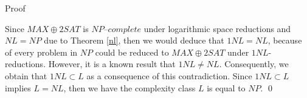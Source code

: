 \documentclass[11pt]{beamer}
\begin{document}
\begin{frame}{Proof}

Since $MAX\oplus2SAT$ is $\textit{NP--complete}$ under logarithmic space reductions and $NL = NP$ due to Theorem \ref{nl}, then we would deduce that $1NL = NL$, because of every problem in $NP$ could be reduced to $MAX\oplus2SAT$ under $1NL$-reductions. However, it is a known result that $1NL \neq NL$. Consequently, we obtain that $1NL \subset L$ as a consequence of this contradiction. Since $1NL \subset L$ implies $L=NL$, then we have the complexity class $L$ is equal to $NP$. \qed

\end{frame}
\end{document}

